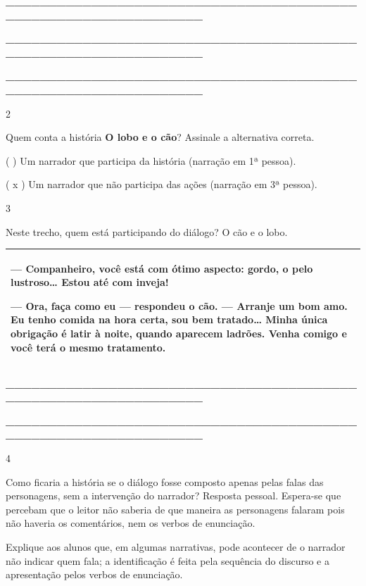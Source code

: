 \begin{itemize}
{{{\begin{itemize}
\begin{itemize}
\begin{itemize}
\textbf{\_\_\_\_\_\_\_\_\_\_\_\_\_\_\_\_\_\_\_\_\_\_\_\_\_\_\_\_\_\_\_\_\_\_\_\_\_\_\_\_\_\_\_\_\_\_\_\_\_\_\_\_\_\_\_\_\_\_\_\_\_\_\_\_}

\textbf{\_\_\_\_\_\_\_\_\_\_\_\_\_\_\_\_\_\_\_\_\_\_\_\_\_\_\_\_\_\_\_\_\_\_\_\_\_\_\_\_\_\_\_\_\_\_\_\_\_\_\_\_\_\_\_\_\_\_\_\_\_\_\_\_}

\textbf{\_\_\_\_\_\_\_\_\_\_\_\_\_\_\_\_\_\_\_\_\_\_\_\_\_\_\_\_\_\_\_\_\_\_\_\_\_\_\_\_\_\_\_\_\_\_\_\_\_\_\_\_\_\_\_\_\_\_\_\_\_\_\_\_}

\num{2}

Quem conta a história \textbf{O lobo e o cão}? Assinale a alternativa
correta.

( ) Um narrador que participa da história (narração em 1ª pessoa).

( x ) Um narrador que não participa das ações (narração em 3ª pessoa).

\num{3}

Neste trecho, quem está participando do diálogo? O cão e o lobo.

\begin{longtable}[]{@{}l@{}}
\toprule
\begin{minipage}[t]{0.97\columnwidth}\raggedright\strut
--- Companheiro, você está com ótimo aspecto: gordo, o pelo
lustroso\ldots{} Estou até com inveja!

--- Ora, faça como eu --- respondeu o cão. --- Arranje um bom amo. Eu
tenho comida na hora certa, sou bem tratado\ldots{} Minha única
obrigação é latir à noite, quando aparecem ladrões. Venha comigo e você
terá o mesmo tratamento.\strut
\end{minipage}\tabularnewline
\bottomrule
\end{longtable}

\textbf{\_\_\_\_\_\_\_\_\_\_\_\_\_\_\_\_\_\_\_\_\_\_\_\_\_\_\_\_\_\_\_\_\_\_\_\_\_\_\_\_\_\_\_\_\_\_\_\_\_\_\_\_\_\_\_\_\_\_\_\_\_\_\_\_}

\textbf{\_\_\_\_\_\_\_\_\_\_\_\_\_\_\_\_\_\_\_\_\_\_\_\_\_\_\_\_\_\_\_\_\_\_\_\_\_\_\_\_\_\_\_\_\_\_\_\_\_\_\_\_\_\_\_\_\_\_\_\_\_\_\_\_}

\num{4}

Como ficaria a história se o diálogo fosse composto apenas pelas falas
das personagens, sem a intervenção do narrador? Resposta pessoal.
Espera-se que percebam que o leitor não saberia de que maneira as
personagens falaram pois não haveria os comentários, nem os verbos de
enunciação.

Explique aos alunos que, em algumas narrativas, pode acontecer de o
narrador não indicar quem fala; a identificação é feita pela sequência
do discurso e a apresentação pelos verbos de enunciação.


\end{itemize}
\end{itemize}
\end{itemize}}}}
\end{itemize}
